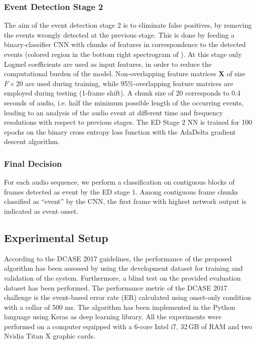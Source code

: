 \subsubsection{Event Detection Stage 2}

The aim of the event detection stage 2 is to eliminate false positives, by removing the events wrongly detected at the previous stage. This is done by feeding a binary-classifier CNN with chunks of features in correspondence to the detected events (colored region in the bottom right spectrogram of ). At this stage only Logmel coefficients are used as input features, in order to reduce the computational burden of the model. Non-overlapping feature matrices $\mathbf{X}$ of size $F\times20$ are used during training, while 95\%-overlapping feature matrices are employed during testing (1-frame shift).
A chunk size of 20 corresponds to 0.4 seconds of audio, i.e. half the minimum possible length of the occurring events, leading to an analysis of the audio event at different time and frequency resolutions with respect to previous stages. The ED Stage 2 NN is trained for 100 epochs on the binary cross entropy loss function with the AdaDelta gradient descent algorithm.


\subsubsection{Final Decision}

For each audio sequence, we perform a classification on contiguous blocks of frames detected as event by the ED stage 1. Among contiguous frame chunks classified as ``event'' by the CNN, the first frame with highest network output is indicated as event onset.


\subsection{Experimental Setup}

According to the DCASE 2017 guidelines, the performance of the proposed algorithm has been assessed by using the development dataset for training and validation of the system. Furthermore, a blind test on the provided evaluation dataset has been performed.
The performance metric of the DCASE 2017 challenge is the event-based error rate (ER) calculated using onset-only condition with a collar of 500 ms. The algorithm has been implemented in the Python language using Keras \cite{chollet2015keras} as deep learning library. All the experiments were performed on a computer equipped with a 6-core Intel i7, 32\,GB of RAM and two Nvidia Titan X graphic cards.

